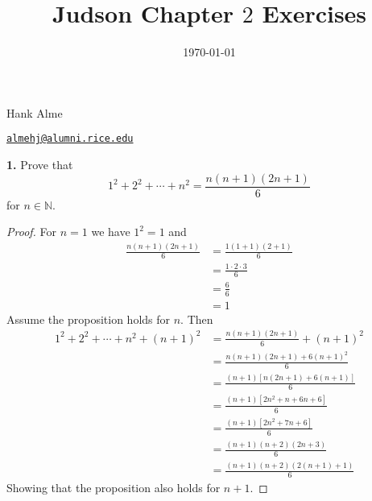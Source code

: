 \documentclass[12pt]{amsart}
\title{Judson Chapter $2$ Exercises}
\date{\today}
\newenvironment{statement}[1]{\smallskip\noindent\color[rgb]{1.00,0.00,0.50} {\bf #1.}}{}
\theoremstyle{definition}
\theoremstyle{remark}
\newcommand{\BN}{\mathbb N}
\begin{document}
\maketitle

\vspace*{-0.25in}
\centerline{Hank Alme}
\centerline{\href{mailto:almehj@alumni.rice.edu}{{\tt almehj@alumni.rice.edu}}}
\vspace*{0.15in}


\begin{statement}{1}
  Prove that
  \begin{equation*}
    1^2 + 2^2 + \cdots + n^2 = \frac{n(n+1)(2n+1)}{6}
  \end{equation*}
  for $n \in \BN$.
\end{statement}
\begin{proof}
  For $n =1$ we have $1^2 = 1$ and
  \begin{align*}
    \frac{n(n+1)(2n+1)}{6} &= \frac{1(1+1)(2+1)}{6} \\
    &= \frac{1 \cdot 2 \cdot 3}{6} \\
    &= \frac{6}{6} \\
    &= 1
  \end{align*}
  Assume the proposition holds for $n$. Then
  \begin{align*}
    1^2 + 2^2 + \cdots + n^2 + (n+1)^2 &= \frac{n(n+1)(2n+1)}{6} + (n+1)^2 \\
    &= \frac{n(n+1)(2n+1) + 6(n+1)^2}{6}  \\
    &= \frac{(n+1)[n(2n+1) + 6(n+1)]}{6}  \\
    &= \frac{(n+1)[2n^2+n + 6n+6]}{6}  \\
    &= \frac{(n+1)[2n^2+7n +6]}{6}  \\
    &= \frac{(n+1)(n+2)(2n +3)}{6}  \\
    &= \frac{(n+1)(n+2)(2(n+1) + 1)}{6}  
  \end{align*}
  Showing that the proposition also holds for $n+1$.
\end{proof}
\end{document}
